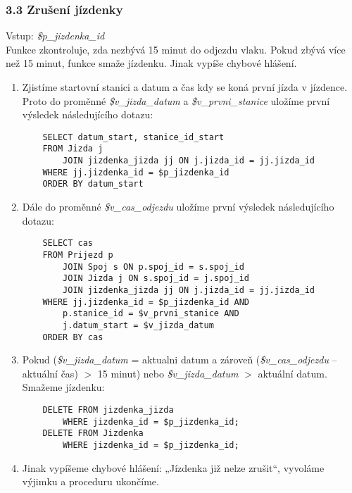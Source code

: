 \documentclass[11pt]{article}
\begin{document}

\subsubsection*{3.3 Zrušení jízdenky}
Vstup: \textit{\$p\_jizdenka\_id}\\
Funkce zkontroluje, zda nezbývá 15 minut do odjezdu vlaku. Pokud zbývá více než 15 minut, funkce smaže jízdenku. Jinak vypíše chybové hlášení.

\begin{enumerate}
    \item Zjistíme startovní stanici a datum a čas kdy se koná první jízda v jízdence. Proto do proměnné \textit{\$v\_jizda\_datum} a \textit{\$v\_prvni\_stanice} uložíme první výsledek následujícího dotazu:
    \begin{lstlisting}
    SELECT datum_start, stanice_id_start
    FROM Jizda j
        JOIN jizdenka_jizda jj ON j.jizda_id = jj.jizda_id
    WHERE jj.jizdenka_id = $p_jizdenka_id
    ORDER BY datum_start
    \end{lstlisting}
    
    \item Dále do proměnné \textit{\$v\_cas\_odjezdu} uložíme první výsledek následujícího dotazu:
    \begin{lstlisting}
    SELECT cas
    FROM Prijezd p
        JOIN Spoj s ON p.spoj_id = s.spoj_id
        JOIN Jizda j ON s.spoj_id = j.spoj_id
        JOIN jizdenka_jizda jj ON j.jizda_id = jj.jizda_id
    WHERE jj.jizdenka_id = $p_jizdenka_id AND
        p.stanice_id = $v_prvni_stanice AND
        j.datum_start = $v_jizda_datum
    ORDER BY cas
    \end{lstlisting}

    \item Pokud (\textit{\$v\_jizda\_datum} = aktualni datum a zároveň (\textit{\$v\_cas\_odjezdu} – aktuální čas) $>$ 15 minut) nebo \textit{\$v\_jizda\_datum} $>$ aktuální datum. Smažeme jízdenku:
    \begin{lstlisting}
    DELETE FROM jizdenka_jizda
        WHERE jizdenka_id = $p_jizdenka_id;
    DELETE FROM Jizdenka
        WHERE jizdenka_id = $p_jizdenka_id;
    \end{lstlisting}

    \item Jinak vypíšeme chybové hlášení: „Jízdenka již nelze zrušit“, vyvoláme výjimku a proceduru ukončíme.
\end{enumerate}
\end{document}
